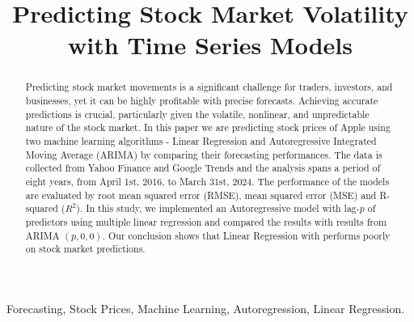 \documentclass[conference,onecolumn,11pt]{IEEEtran}
\begin{document}
\title{Predicting Stock Market Volatility with Time Series Models\\
}

\author{
\and
{}
}

\maketitle

\begin{abstract}
Predicting stock market movements is a significant challenge for traders, investors, and businesses, yet it can be highly profitable with precise forecasts. Achieving accurate predictions is crucial, particularly given the volatile, nonlinear, and unpredictable nature of the stock market. In this paper we are predicting stock prices of Apple using two machine learning algorithms - Linear Regression and Autoregressive Integrated Moving Average (ARIMA) by comparing their forecasting performances. The data is collected from Yahoo Finance and Google Trends and the analysis spans a period of eight years, from April 1st, 2016, to March 31st, 2024. The performance of the models are evaluated by root mean squared error (RMSE), mean squared error (MSE) and R-squared ($R^2$). 
In this study, we implemented an Autoregressive model with lag-$p$ of predictors using multiple linear regression and compared the results with results from ARIMA $(p,0,0)$. Our conclusion shows that Linear Regression with performs poorly on stock market predictions.

\end{abstract}

\begin{IEEEkeywords}
Forecasting, Stock Prices, Machine Learning, Autoregression, Linear Regression. 
\end{IEEEkeywords}
\end{document}
